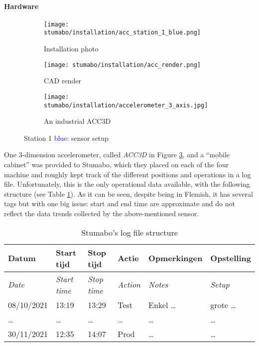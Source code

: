 \paragraph{Hardware} 
\begin{figure}[ht]
    \begin{subfigure}{0.33\textwidth}
        \centering
        \texttt{[image: stumabo/installation/acc\_station\_1\_blue.png]}
        \caption{Installation photo}
        \label{fig:s1b_foto}
    \end{subfigure}
    \begin{subfigure}{0.33\textwidth}
        \centering
        \texttt{[image: stumabo/installation/acc\_render.png]}
        \caption{CAD render}
        \label{fig:s1b_render}
    \end{subfigure}
    \begin{subfigure}{0.32\textwidth}
        \centering
        \texttt{[image: stumabo/installation/accelerometer\_3\_axis.jpg]}
        \caption{An industrial ACC3D}
        \label{fig:stumabo_acc3d}
    \end{subfigure}
    \caption{Station 1 \textcolor{blue}{blue}: sensor setup}
    \label{fig:stu_station1_b}
\end{figure}
One 3-dimension accelerometer, called \textit{ACC3D} in Figure \ref{fig:stumabo_acc3d}, and a ``mobile cabinet'' was provided to Stumabo, 
which they placed on each of the four machine and roughly kept track of the different positions and operations in a log file.
Unfortunately, this is the only operational data available, with the following structure (see Table \ref{tab:stu_logfile}).
As it can be  seen, despite being in Flemish, it has several tags but with one big issue: start and end time are approximate and do not reflect the data trends collected by the above-mentioned sensor.

\begin{table}[ht]
    \centering
    \begin{tabularx}{\textwidth}{llllll}
        \toprule
        Datum & Start tijd & Stop tijd & Actie & Opmerkingen & Opstelling \\\midrule
        \textit{Date} & \textit{Start time} & \textit{Stop time} & \textit{Action} & \textit{Notes} & \textit{Setup} \\\midrule
        08/10/2021 & 13:19 & 13:29 & Test & Enkel \dots & grote \dots \\ %
        \midrule
        \dots & \dots & \dots & \dots & \dots & \dots \\\midrule
        30/11/2021 & 12:35 & 14:07 & Prod & \dots & \dots \\\bottomrule
    \end{tabularx}
    \caption{Stumabo's log file structure}
    \label{tab:stu_logfile}
\end{table}

